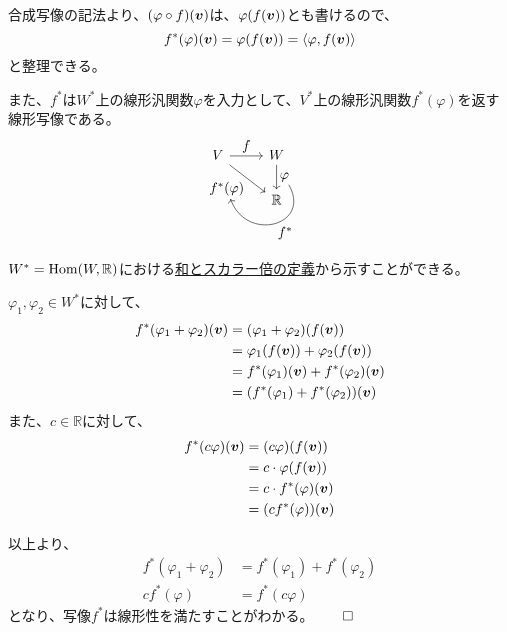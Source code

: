 \documentclass[../../../topic_linear-algebra]{subfiles}
\begin{document}
合成写像の記法より、$(\varphi \circ f)(\vb*{v})$は、$\varphi(f(\vb*{v}))$とも書けるので、
\begin{equation*}
  f^*(\varphi)(\vb*{v}) = \varphi(f(\vb*{v})) = \langle \varphi, f(\vb*{v}) \rangle
\end{equation*}
と整理できる。

\br

また、$f^*$は$W^*$上の線形汎関数$\varphi$を入力として、$V^*$上の線形汎関数$f^*(\varphi)$を返す線形写像である。
\begin{equation*}
  \begin{tikzcd}[every label/.append style = {font = \normalsize}]
    V \arrow[r,"f"]\arrow[rd, "f^*(\varphi)"'{name=v}] & W \arrow[d,"\varphi"{name=w}] \arrow[from=w,to=v,out=-60, in=-70,looseness=2,"f^*"]\\
    & \mathbb{R}
  \end{tikzcd}
\end{equation*}

\br

\begin{handout}[補足：なぜ$f^*$は線形写像といえるのか]
  $W^* = \operatorname{Hom}(W, \mathbb{R})$における\hyperref[def:linear-map-addition-scalar]{和とスカラー倍の定義}から示すことができる。
  
  \br
  
  $\varphi_1, \varphi_2 \in W^*$に対して、
  \begin{align*}
    f^*(\varphi_1 + \varphi_2)(\vb*{v}) & = (\varphi_1 + \varphi_2)(f(\vb*{v})) \\
                                & = \varphi_1(f(\vb*{v})) + \varphi_2(f(\vb*{v})) \\
                                & = f^*(\varphi_1)(\vb*{v}) + f^*(\varphi_2)(\vb*{v}) \\
                                & = (f^*(\varphi_1) + f^*(\varphi_2))(\vb*{v})
  \end{align*}
  また、$c \in \mathbb{R}$に対して、
  \begin{align*}
    f^*(c\varphi)(\vb*{v}) & = (c\varphi)(f(\vb*{v})) \\
                            & = c\cdot\varphi(f(\vb*{v})) \\
                            & = c\cdot f^*(\varphi)(\vb*{v}) \\
                            & = (c f^*(\varphi))(\vb*{v})
  \end{align*}
  
  以上より、
  \begin{align*}
    f^*(\varphi_1 + \varphi_2) & = f^*(\varphi_1) + f^*(\varphi_2) \\
    c f^*(\varphi)             & = f^*(c\varphi)
  \end{align*}
  となり、写像$f^*$は線形性を満たすことがわかる。$\qed$
\end{handout}
\end{document}
